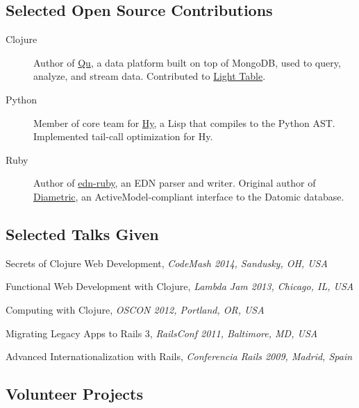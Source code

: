 \subsection{Selected Open Source
Contributions}\label{selected-open-source-contributions}

\begin{description}
\item[Clojure]
Author of \href{http://github.com/cfpb/qu}{Qu}, a data platform built on
top of MongoDB, used to query, analyze, and stream data. Contributed to
\href{http://lighttable.com/}{Light Table}.
\item[Python]
Member of core team for \href{http://hylang.org/}{Hy}, a Lisp that
compiles to the Python AST. Implemented tail-call optimization for Hy.
\item[Ruby]
Author of \href{https://github.com/relevance/edn-ruby}{edn-ruby}, an EDN
parser and writer. Original author of
\href{https://github.com/relevance/diametric}{Diametric}, an
ActiveModel-compliant interface to the Datomic database.
\end{description}

\subsection{Selected Talks Given}\label{selected-talks-given}

Secrets of Clojure Web Development, \emph{CodeMash 2014, Sandusky, OH,
USA}

Functional Web Development with Clojure, \emph{Lambda Jam 2013, Chicago,
IL, USA}

Computing with Clojure, \emph{OSCON 2012, Portland, OR, USA}

Migrating Legacy Apps to Rails 3, \emph{RailsConf 2011, Baltimore, MD,
USA}

Advanced Internationalization with Rails, \emph{Conferencia Rails 2009,
Madrid, Spain}

\subsection{Volunteer Projects}\label{volunteer-projects}


